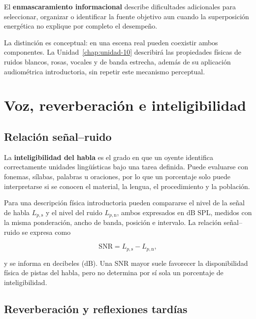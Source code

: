 El \textbf{enmascaramiento informacional} describe dificultades adicionales
para seleccionar, organizar o identificar la fuente objetivo aun cuando la
superposición energética no explique por completo el desempeño.

La distinción es conceptual: en una escena real pueden coexistir ambos
componentes. La Unidad~\ref{chap:unidad-10} describirá las propiedades físicas de ruidos
blancos, rosas, vocales y de banda estrecha, además de su aplicación
audiométrica introductoria, sin repetir este mecanismo perceptual.

\section{Voz, reverberación e inteligibilidad}
\label{sec:u7-inteligibilidad}

\subsection{Relación señal--ruido}
\label{sec:u7-snr}

La \textbf{inteligibilidad del habla} es el grado en que un oyente identifica
correctamente unidades lingüísticas bajo una tarea definida. Puede evaluarse
con fonemas, sílabas, palabras u oraciones, por lo que un porcentaje solo puede
interpretarse si se conocen el material, la lengua, el procedimiento y la
población.

Para una descripción física introductoria pueden compararse el nivel de la
señal de habla \(L_{p,\mathrm{s}}\) y el nivel del ruido
\(L_{p,\mathrm{n}}\), ambos expresados en \(\text{dB SPL}\), medidos con la
misma ponderación, ancho de banda, posición e intervalo. La relación
señal--ruido se expresa como

\begin{equation}
    \mathrm{SNR}
      =L_{p,\mathrm{s}}-L_{p,\mathrm{n}},
    \label{eq:u7-snr}
\end{equation}

y se informa en decibeles (\(\text{dB}\)). Una SNR mayor suele favorecer la
disponibilidad física de pistas del habla, pero no determina por sí sola un
porcentaje de inteligibilidad.

\subsection{Reverberación y reflexiones tardías}
\label{sec:u7-reverberacion}

